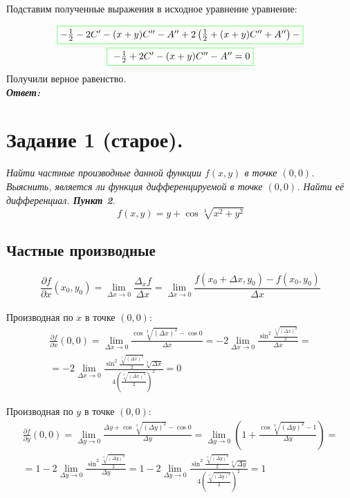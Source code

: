\documentclass[a5paper, 10pt]{article}
\theoremstyle{definition}
\theoremstyle{plain}
\theoremstyle{remark}
\begin{document}
Подставим полученные выражения в исходное уравнение уравнение:

\begin{multline}
\fcolorbox{green}{white}{$- \frac{ 1}{2}  - 2C' -  (x + y)C'' - A'' + 2 \left(  \frac{ 1}{2} + (x + y)C'' + A'' \right) - $} \\
 \fcolorbox{green}{white}{ $- \frac{ 1}{2} + 2 C' - (x+y)C'' - A'' = 0 $}
\end{multline}
Получили верное равенство.\\

\textit{\textbf{Ответ:}} 


\newpage




\newpage
\section{Задание 1 (старое).}
\textit{Найти частные производные данной функции $f(x, y)$ в точке $(0, 0)$. Выяснить, является ли функция дифференцируемой в точке $(0, 0)$. Найти её дифференциал. \textbf{Пункт 2}.}
\begin{equation}
f(x, y) = y + \cos \sqrt[3]{x^2 + y^2}
\end{equation}
\subsection{Частные производные}

\begin{equation}
\frac{\partial f}{\partial x} (x_0, y_0) = \lim_{\Delta x \to 0} \frac{\Delta_x f}{\Delta x} = \lim_{\Delta x \to 0} \frac{f ( x_0 + \Delta x, y_0) - f(x_0, y_0)}{\Delta x}
\end{equation}
\\

Производная по $x$ в точке $(0, 0)$:
\begin{multline}
\frac{\partial f}{\partial x} (0, 0) = \lim_{\Delta x \to 0} \frac{\cos \sqrt[3]{( \Delta x)^2} - \cos 0}{\Delta x} = 
-2 \lim_{\Delta x \to 0} \frac{\sin^2  \frac{ \sqrt[3]{( \Delta x)^2}}{2}}{\Delta x} =\\
= -2 \lim_{\Delta x \to 0} \frac{\sin^2  \frac{ \sqrt[3]{( \Delta x)^2}}{2} \sqrt[3]{ \Delta x}}{4 \left(\frac{ \sqrt[3]{( \Delta x)^2}}{2} \right)^2} = 0
\end{multline}


Производная по $y$ в точке $(0, 0)$:
\begin{multline}
\frac{\partial f}{\partial y} (0, 0) = \lim_{\Delta y \to 0} \frac{\Delta y + \cos \sqrt[3]{( \Delta y)^2} - \cos 0}{\Delta y} = 
\lim_{\Delta y \to 0} \left(1 +  \frac{\cos \sqrt[3]{( \Delta y)^2} - 1}{\Delta y} \right) =\\
= 1 - 2 \lim_{\Delta y \to 0} \frac{\sin^2  \frac{ \sqrt[3]{( \Delta y)^2}}{2}}{\Delta y} 
=1 -2 \lim_{\Delta y \to 0} \frac{\sin^2  \frac{ \sqrt[3]{( \Delta y)^2}}{2} \sqrt[3]{ \Delta y}}{4 \left(\frac{ \sqrt[3]{( \Delta y)^2}}{2} \right)^2} = 1
\end{multline}
\end{document}

